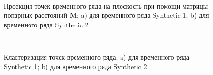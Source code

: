 \begin{figure}[h!t]\center
{}
\\
\caption{Проекция точек временного ряда на плоскость при помощи матрицы попарных расстояний $\textbf{M}$: a) для временного ряда Synthetic 1; b) для временного ряда Synthetic 2}
\label{fig_synthetic_2D}
\end{figure}

\begin{figure}[h!t]\center
{}
\\
\caption{Кластеризация точек временного ряда: a) для временного ряда Synthetic 1; b) для временного ряда Synthetic 2}
\label{fig_synthetic_claster}
\end{figure}


